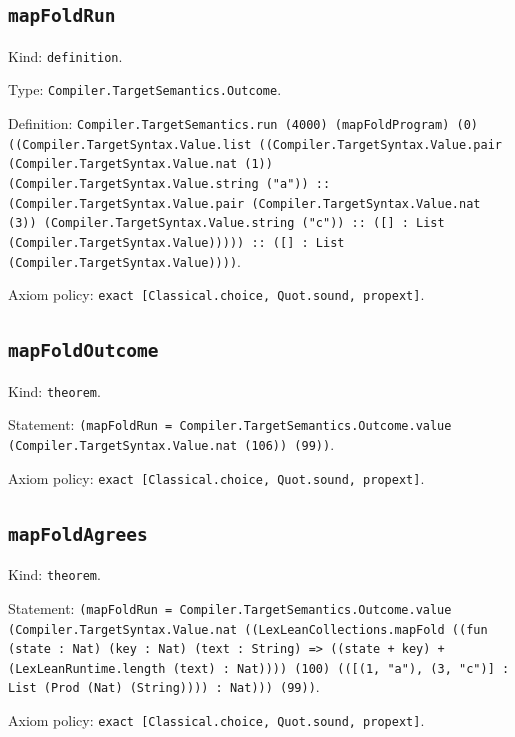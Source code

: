 \documentclass[11pt]{article}
\begin{document}
\subsection*{\texttt{mapFoldRun}}
\noindent Kind: \texttt{definition}.\par
\noindent Type: \texttt{Compiler.TargetSemantics.Outcome}.\par
\noindent Definition: \texttt{Compiler.TargetSemantics.run (4000) (mapFoldProgram) (0) ((Compiler.TargetSyntax.Value.list ((Compiler.TargetSyntax.Value.pair (Compiler.TargetSyntax.Value.nat (1)) (Compiler.TargetSyntax.Value.string ("a")) :: (Compiler.TargetSyntax.Value.pair (Compiler.TargetSyntax.Value.nat (3)) (Compiler.TargetSyntax.Value.string ("c")) :: ([] : List (Compiler.TargetSyntax.Value))))) :: ([] : List (Compiler.TargetSyntax.Value))))}.\par
\noindent Axiom policy: \texttt{exact [Classical.choice, Quot.sound, propext]}.\par
\subsection*{\texttt{mapFoldOutcome}}
\noindent Kind: \texttt{theorem}.\par
\noindent Statement: \texttt{(mapFoldRun = Compiler.TargetSemantics.Outcome.value (Compiler.TargetSyntax.Value.nat (106)) (99))}.\par
\noindent Axiom policy: \texttt{exact [Classical.choice, Quot.sound, propext]}.\par
\subsection*{\texttt{mapFoldAgrees}}
\noindent Kind: \texttt{theorem}.\par
\noindent Statement: \texttt{(mapFoldRun = Compiler.TargetSemantics.Outcome.value (Compiler.TargetSyntax.Value.nat ((LexLeanCollections.mapFold ((fun (state : Nat) (key : Nat) (text : String) => ((state + key) + (LexLeanRuntime.length (text) : Nat)))) (100) (([(1, "a"), (3, "c")] : List (Prod (Nat) (String)))) : Nat))) (99))}.\par
\noindent Axiom policy: \texttt{exact [Classical.choice, Quot.sound, propext]}.\par
\end{document}

